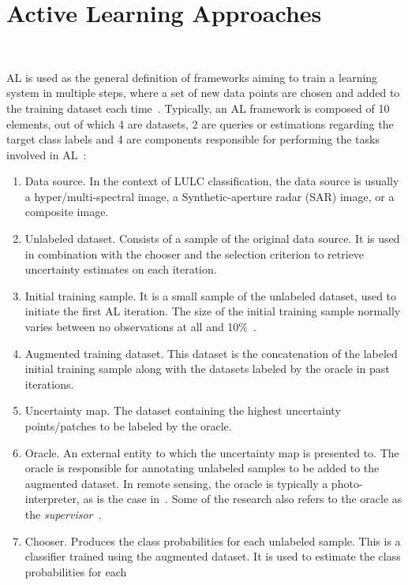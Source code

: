 \documentclass[parskip=full]{scrartcl}
\begin{document}
\section{Active Learning Approaches}~\label{sec:al-sota}

AL is used as the general definition of frameworks aiming to train a learning system in multiple
steps, where a set of new data points are chosen and added to the training dataset each
time~\cite{Ruzicka2020}. Typically, an AL framework is composed of 10 elements, out of which 4 are
datasets, 2 are queries or estimations regarding the target class labels and 4 are components
responsible for performing the tasks involved in AL~\cite{Sverchkov2017,Su2020,Ruzicka2020}:

\begin{enumerate}
    \item Data source. In the context of LULC classification, the data source is usually a
        hyper/multi-spectral image, a Synthetic-aperture radar (SAR) image, or a composite image.
    \item Unlabeled dataset. Consists of a sample of the original data source. It is used in
        combination with the chooser and the selection criterion to retrieve uncertainty estimates
        on each iteration.
    \item Initial training sample. It is a small sample of the unlabeled dataset, used to initiate
        the first AL iteration. The size of the initial training sample normally varies between no
        observations at all and 10\%~\cite{Li2013}.
    \item Augmented training dataset. This dataset is the concatenation of the labeled initial
        training sample along with the datasets labeled by the oracle in past iterations.
    \item Uncertainty map. The dataset containing the highest uncertainty points/patches to be
        labeled by the oracle.
    \item Oracle. An external entity to which the uncertainty map is presented to. The oracle is
        responsible for annotating unlabeled samples to be added to the augmented dataset. In remote
        sensing, the oracle is typically a photo-interpreter, as is the case in~\cite{li2020}. Some
        of the research also refers to the oracle as the \textit{supervisor}~\cite{Su2020,
        Shrivastava2021}.
    \item Chooser. Produces the class probabilities for each unlabeled sample. This is a classifier
        trained using the augmented dataset. It is used to estimate the class probabilities for each

\end{enumerate}
\end{document}
